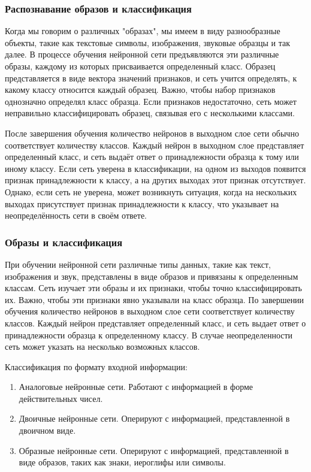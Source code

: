 \subsubsection{Распознавание образов и классификация}
Когда мы говорим о различных "образах", мы имеем в виду разнообразные объекты, такие как текстовые символы, изображения, звуковые образцы и так далее. В процессе обучения нейронной сети предъявляются эти различные образы, каждому из которых присваивается определенный класс. Образец представляется в виде вектора значений признаков, и сеть учится определять, к какому классу относится каждый образец. Важно, чтобы набор признаков однозначно определял класс образца. Если признаков недостаточно, сеть может неправильно классифицировать образец, связывая его с несколькими классами.

После завершения обучения количество нейронов в выходном слое сети обычно соответствует количеству классов. Каждый нейрон в выходном слое представляет определенный класс, и сеть выдаёт ответ о принадлежности образца к тому или иному классу. Если сеть уверена в классификации, на одном из выходов появится признак принадлежности к классу, а на других выходах этот признак отсутствует. Однако, если сеть не уверена, может возникнуть ситуация, когда на нескольких выходах присутствует признак принадлежности к классу, что указывает на неопределённость сети в своём ответе.

\subsubsection{Образы и классификация}
При обучении нейронной сети различные типы данных, такие как текст, изображения и звук, представлены в виде образов и привязаны к определенным классам. Сеть изучает эти образы и их признаки, чтобы точно классифицировать их. Важно, чтобы эти признаки явно указывали на класс образца. По завершении обучения количество нейронов в выходном слое сети соответствует количеству классов. Каждый нейрон представляет определенный класс, и сеть выдает ответ о принадлежности образца к определенному классу. В случае неопределенности сеть может указать на несколько возможных классов.

Классификация по формату входной информации:
\begin{enumerate}
\item Аналоговые нейронные сети. Работают с информацией в форме действительных чисел.
\item Двоичные нейронные сети. Оперируют с информацией, представленной в двоичном виде.
\item Образные нейронные сети. Оперируют с информацией, представленной в виде образов, таких как знаки, иероглифы или символы.
\end{enumerate}

